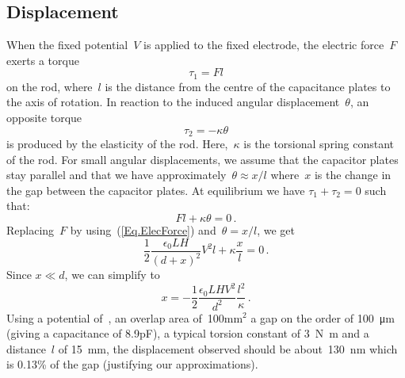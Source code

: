 \subsection{Displacement}
\label{sec.displacement}
When the fixed potential~$V$ is applied to the fixed electrode, the electric force~$F$ exerts a torque
\begin{equation}
\tau_1 = F l
\end{equation}
on the rod, where~$l$ is the distance from the centre of the capacitance plates to the axis of rotation. In reaction to the induced angular displacement~$\theta$, an opposite torque
\begin{equation}
\tau_2 = -\kappa \theta
\end{equation}
is produced by the elasticity of the rod. Here,~$\kappa$ is the torsional spring constant of the rod. For small angular displacements, we assume that the capacitor plates stay parallel and that we have approximately~$\theta \approx x/l$ where~$x$ is the change in the gap between the capacitor plates. At equilibrium we have $\tau_1+\tau_2 = 0$ such that:
\begin{equation}
\label{eq.static_equilibrium}
F l + \kappa \theta = 0\,.
\end{equation}
Replacing~$F$ by using~(\ref{Eq.ElecForce}) and~$\theta = x/l$, we get
\begin{equation}
\frac{1}{2} \frac{\epsilon_0 L H}{(d+x)^2} V^2 l + \kappa \frac{x}{l} = 0 \,.
\end{equation}
Since $x\ll d$, we can simplify to
\begin{equation}
x = - \frac{1}{2} \frac{\epsilon_0 L H V^2}{d^2} \frac{l^2}{\kappa} \,.
\end{equation}
Using a potential of~\drivepotential, an overlap area of~100mm$^2$
a gap on the order of \si{\num{100}\micro\meter} (giving a capacitance of 8.9pF), a typical torsion constant of \si{\num{3}\newton\meter} and a distance~$l$ of \si{\num{15}\milli\meter}, the displacement observed should be about~\si{\num{130}\nano\meter} which is 0.13\% of the gap (justifying our approximations).

